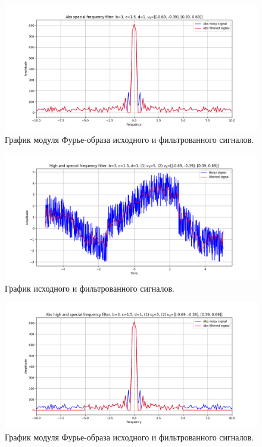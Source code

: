 \documentclass[a4paper, 12pt]{article}
\begin{document}
    \begin{figure}[!htb]
        \centering
        \includegraphics[scale=0.485]{7_1_abs_u_U_nospec.png}
        \captionsetup{skip=0pt}
        \caption{График модуля Фурье-образа исходного и фильтрованного сигналов.}
        \label{fig:fig108}
    \end{figure}
    \begin{figure}[!htb]
        \centering
        \includegraphics[scale=0.485]{7_2_u_flt_u_nospec.png}
        \captionsetup{skip=0pt}
        \caption{График исходного и фильтрованного сигналов.}
        \label{fig:fig109}
    \end{figure}
    \begin{figure}[!htb]
        \centering
        \includegraphics[scale=0.485]{7_2_abs_u_U_nospec.png}
        \captionsetup{skip=0pt}
        \caption{График модуля Фурье-образа исходного и фильтрованного сигналов.}
        \label{fig:fig110}
    \end{figure}
\end{document}
